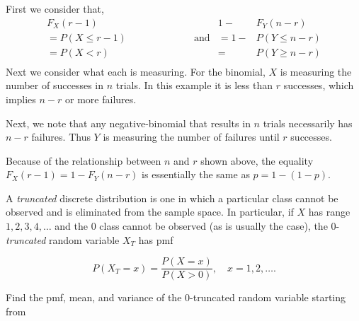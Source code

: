 \documentclass[12pt,letterpaper]{exam}
\begin{document}
\begin{questions}
	\begin{solution}
		First we consider that,
		\begin{align*}
			F_X(r-1)& & 1- &F_Y(n-r) \\
			=P(X \leq r-1)& \hspace{6em} \text{and}& =1- &P(Y \leq n-r) \\
			=P(X < r)& & =&P(Y \geq n-r) \\
		\end{align*}
		Next we consider what each is measuring. For the binomial, \(X\) is measuring the number of successes in \(n\) trials.
		In this example it is less than \(r\) successes, which implies \(n-r\) or more failures.
		
		Next, we note that any negative-binomial that results in \(n\) trials necessarily has \(n-r\) failures.		
		Thus \(Y\) is measuring the number of failures until \(r\) successes.
	
		Because of the relationship between \(n\) and \(r\) shown above, the equality \(F_X(r-1) = 1-F_Y(n-r)\)
		is essentially the same as \(p = 1 - (1-p)\).
		
	\end{solution}
	
	\question 
	A \textit{truncated} discrete distribution is one in which a particular class cannot be observed
	and is eliminated from the sample space. In particular, if \(X\) has range \(1,2,3,4,\ldots\) and
	the 0 class cannot be observed (as is usually the case), the 0-\textit{truncated} random variable
	\(X_T\) has pmf
	
	\[P(X_T=x) = \frac{P(X=x)}{P(X>0)}, \quad x=1,2,\ldots.\]
	
	Find the pmf, mean, and variance of the 0-truncated random variable starting from
	
	\begin{solution}
\end{solution}
\end{questions}
\end{document}
